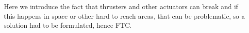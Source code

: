 Here we introduce the fact that thrusters and other actuators can break and if this happens in space or other hard to reach areas, that can be problematic, so a solution had to be formulated, hence FTC.